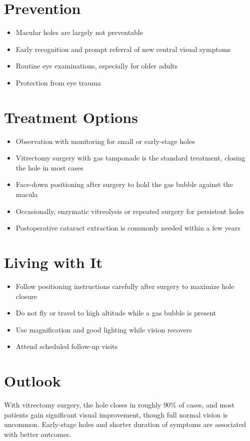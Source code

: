 \section{Prevention}
\begin{itemize}[noitemsep]
  \item Macular holes are largely not preventable
  \item Early recognition and prompt referral of new central visual symptoms
  \item Routine eye examinations, especially for older adults
  \item Protection from eye trauma
\end{itemize}
\section{Treatment Options}
\begin{itemize}[noitemsep]
  \item Observation with monitoring for small or early-stage holes
  \item Vitrectomy surgery with gas tamponade is the standard treatment, closing the hole in most cases
  \item Face-down positioning after surgery to hold the gas bubble against the macula
  \item Occasionally, enzymatic vitreolysis or repeated surgery for persistent holes
  \item Postoperative cataract extraction is commonly needed within a few years
\end{itemize}
\section{Living with It}
\begin{itemize}[noitemsep]
  \item Follow positioning instructions carefully after surgery to maximize hole closure
  \item Do not fly or travel to high altitude while a gas bubble is present
  \item Use magnification and good lighting while vision recovers
  \item Attend scheduled follow-up visits
\end{itemize}
\section{Outlook}
With vitrectomy surgery, the hole closes in roughly 90\% of cases, and most patients gain significant visual improvement, though full normal vision is uncommon. Early-stage holes and shorter duration of symptoms are associated with better outcomes.
